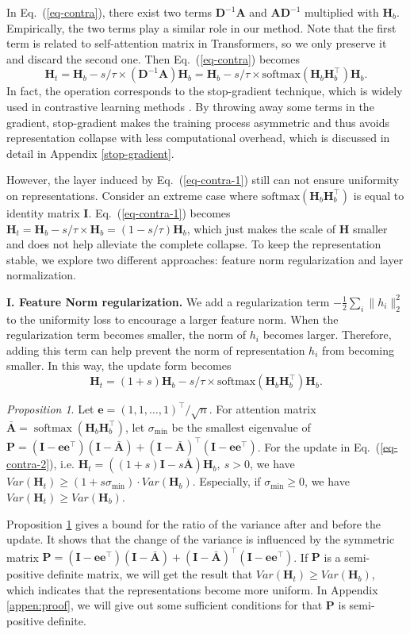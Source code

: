 \documentclass{article}
\def\ve{{\bm{e}}}
\def\mA{{\bm{A}}}
\def\mD{{\bm{D}}}
\def\mH{{\bm{H}}}
\def\mI{{\bm{I}}}
\def\mP{{\bm{P}}}
\newcommand{\softmax}{\mathrm{softmax}}
\theoremstyle{definition}
\theoremstyle{remark}
\theoremstyle{theorem}
\newtheorem{proposition}{Proposition}
\begin{document}
In Eq.~(\ref{eq-contra}), there exist two terms $\mD^{-1}\mA$ and $\mA\mD^{-1}$ multiplied with $\mH_b$. Empirically, the two terms play a similar role in our method. Note that the first term is related to self-attention matrix in Transformers, so we only preserve it and discard the second one. Then Eq.~(\ref{eq-contra}) becomes 
\begin{equation} \label{eq-contra-1}
    \mH_t=\mH_b-s/\tau\times(\mD^{-1}\mA)\mH_b = \mH_b - s/\tau \times \text{softmax}(\mH_b \mH_b^{\top})\mH_b.
\end{equation}
In fact, the operation corresponds to the stop-gradient technique, which is widely used in contrastive learning methods \citep{He_2020_CVPR, grill2020bootstrap,tao2022exploring}. By throwing away some terms in the gradient, stop-gradient makes the training process asymmetric and thus avoids representation collapse with less computational overhead, which is discussed in detail in Appendix \ref{stop-gradient}.

However, the layer induced by Eq.~(\ref{eq-contra-1}) still can not ensure uniformity on representations. Consider an extreme case where $\softmax(\mH_b\mH_b^{\top})$ is equal to identity matrix $\mI$. Eq.~(\ref{eq-contra-1}) becomes $\mH_t = \mH_b - s/\tau \times \mH_b = (1-s/\tau)\mH_b$, which just makes the scale of $\mH$ smaller and does not help alleviate the complete collapse. To keep the representation stable, we explore two different approaches: feature norm regularization and layer normalization.

\textbf{I. Feature Norm regularization.} We add a regularization term $-\frac{1}{2}\sum_i\|h_i\|_2^2$ to the uniformity loss to encourage a larger feature norm. When the regularization term becomes smaller, the norm of $h_i$ becomes larger. Therefore, adding this term can help prevent the norm of representation $h_i$ from becoming smaller. In this way, the update form becomes
\begin{equation} \label{eq-contra-2}
    \mH_t = (1 + s) \mH_b - s/\tau \times \softmax(\mH_b\mH_b^{\top})\mH_b.
\end{equation}
\begin{proposition}
\label{proposition:complete}
    Let $\ve=(1,1,\dots,1)^{\top}/\sqrt{n}$. For attention matrix $\bar{\mA}=\operatorname{softmax}(\mH_b\mH_b^{\top})$, let $\sigma_{\min}$ be the smallest eigenvalue of  $\mP=(\mI-\ve\ve^{\top})(\mI-\bar{\mA})+(\mI-\bar{\mA})^{\top}(\mI-\ve\ve^{\top})$. For the update in Eq.~(\ref{eq-contra-2}), i.e. $\mH_t=((1+s)\mI-s\bar{\mA})\mH_b,\ s>0$, we have $Var(\mH_t)\geq (1+s\sigma_{\min})\cdot Var(\mH_b)$. Especially, if $\sigma_{\min}\geq0$, we have $Var(\mH_t)\geq Var(\mH_b)$.
\end{proposition}
Proposition \ref{proposition:complete} gives a bound for the ratio of the variance after and before the update. It shows that the change of the variance is influenced by the symmetric matrix $\mP=(\mI-\ve\ve^{\top})(\mI-\bar{\mA})+(\mI-\bar{\mA})^{\top}(\mI-\ve\ve^{\top})$. If $\mP$ is a semi-positive definite matrix, we will get the result that $Var(\mH_t)\geq Var(\mH_b)$, which indicates that the representations become more uniform. In Appendix \ref{appen:proof}, we will give out some sufficient conditions for that $\mP$ is semi-positive definite.
\end{document}
